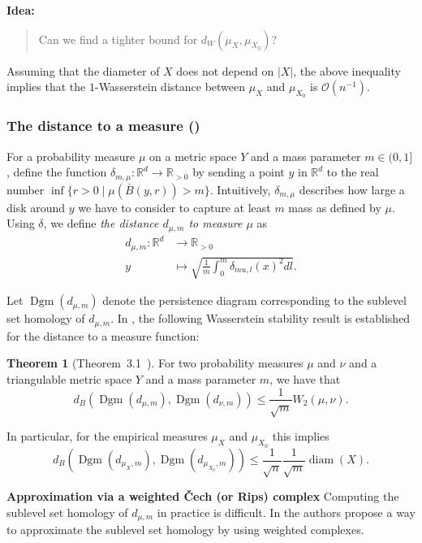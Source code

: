 \documentclass[10pt,a4paper]{article}
\theoremstyle{definition}
\newtheorem{thm}{Theorem}[section]
\newcommand{\R}{\mathbb{R}}
\newenvironment{idea}{%
	\begin{tcolorbox}[colback=green, breakable, sharp corners]
		\textbf{Idea: }
		\medskip
		\begin{quote}
			\centering
}{\end{quote}\medskip\end{tcolorbox}}
\begin{document}
\begin{idea}
	Can we find a tighter bound for $d_W(\mu_X, \mu_{X_0})$?
\end{idea}

Assuming that the diameter of $X$ does not depend on $|X|$, the above inequality implies that the $1$-Wasserstein distance between $\mu_X$ and $\mu_{X_0}$ is $\mathcal{O}(n^{-1})$.

\subsubsection{The distance to a measure (\autocite{Buchet2013})}
For a probability measure $\mu$ on a metric space $Y$ and a mass parameter $m\in(0,1]$, define the function $\delta_{m,\mu}\colon\R^d\to\R_{>0}$ by sending a point $y$ in $\R^d$ to the real number $\inf\{r>0\mid\mu(\bar{B}(y,r))>m\}$. Intuitively, $\delta_{m,\mu}$ describes how large a disk around $y$ we have to consider to capture at least $m$ mass as defined by $\mu$. Using $\delta$, we define \textit{the distance $d_{\mu,m}$ to measure $\mu$} as
\begin{align*}
	d_{\mu,m}\colon\R^d&\to\R_{>0}\\
	y&\mapsto\sqrt{\frac{1}{m}\int_0^m\delta_{mu,l}(x)^2dl}.
\end{align*}

Let $\operatorname{Dgm}(d_{\mu,m})$ denote the persistence diagram corresponding to the sublevel set homology of $d_{\mu,m}$. In \autocite{Buchet2013}, the following Wasserstein stability result is established for the distance to a measure function:
\begin{thm}[Theorem~3.1~\autocite{Buchet2013}]
	For two probability measures $\mu$ and $\nu$ and a triangulable metric space $Y$ and a mass parameter $m$, we have that
	$$
	d_B(\operatorname{Dgm}(d_{\mu,m}), \operatorname{Dgm}(d_{\nu,m})) \leq \frac{1}{\sqrt{m}}W_2(\mu, \nu).
	$$
\end{thm}

In particular, for the empirical measures $\mu_X$ and $\mu_{X_0}$ this implies
$$
d_B(\operatorname{Dgm}(d_{\mu_X,m}), \operatorname{Dgm}(d_{\mu_{X_0},m})) \leq \frac{1}{\sqrt{n}}\frac{1}{\sqrt{m}}\operatorname{diam}(X).
$$

\textbf{Approximation via a weighted Čech (or Rips) complex}
Computing the sublevel set homology of $d_{\mu, m}$ in practice is difficult. In \autocite{Hoefgeest2022} the authors propose a way to approximate the sublevel set homology by using weighted complexes.
\end{document}
